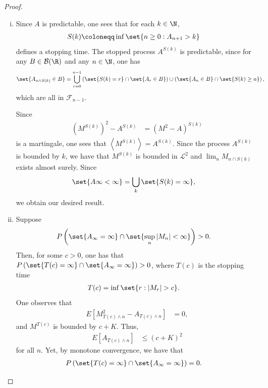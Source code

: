 \documentclass[10pt]{mypackage}
\renewcommand{\coloneq}{\coloneqq}
\begin{document}
\begin{proof}\hfill
  \begin{enumerate}[(i)]
    \item Since $A$ is predictable, one sees that for each $k\in \N$,
      \begin{align*}
        S(k) &\coloneq \inf\set{n\geq 0 : A_{n+1} > k}
      \end{align*}
      defines a stopping time. The stopped process $A^{S(k)}$ is predictable, since for any $B\in \mathcal{B}(\R)$ and any $n\in \N$, one has
      \begin{align*}
        \set{A_{n\wedge S(k)}\in B} &= \bigcup_{r=0}^{n-1}\left( \set{S(k) = r}\cap \set{A_r\in B} \right) \cup \left( \set{A_n\in B}\cap \set{S(k) \geq n} \right),
      \end{align*}
      which are all in $\mathcal{F}_{n-1}$.

      Since
      \begin{align*}
        \left( M^{S(k)} \right)^2 - A^{S(k)} &= \left( M^2-A \right)^{S(k)}
      \end{align*}
      is a martingale, one sees that $ \left\langle M^{S(k)} \right\rangle = A^{S(k)} $. Since the process $A^{S(k)}$ is bounded by $k$, we have that $M^{S(k)}$ is bounded in $ \mathcal{L}^2 $ and $\lim_{n} M_{n\cap S(k)}$ exists almost surely. Since
      \begin{align*}
        \set{A{\infty} < \infty} &= \bigcup_{k}\set{S(k) = \infty},
      \end{align*}
      we obtain our desired result.
    \item Suppose
      \begin{align*}
        P\left( \set{A_{\infty} = \infty}\cap \set{\sup_{n}\left\vert M_n \right\vert < \infty} \right) &> 0.
      \end{align*}
      Then, for some $c > 0$, one has that $P\left( \set{T(c) = \infty}\cap \set{A_{\infty} = \infty} \right) > 0$, where $T(c)$ is the stopping time
      \begin{align*}
        T(c) &= \inf\set{r : \left\vert M_r \right\vert > c}.
      \end{align*}
      One observes that
      \begin{align*}
        E\left[ M_{T(c)\wedge n}^2 - A_{T(c)\wedge n} \right] &= 0,
      \end{align*}
      and $M^{T(c)}$ is bounded by $c + K$. Thus,
      \begin{align*}
        E\left[ A_{T(c)\wedge n} \right] &\leq \left( c+ K \right)^2
      \end{align*}
      for all $n$. Yet, by monotone convergence, we have that 
      \begin{align*}
        P\left( \set{T(c) = \infty}\cap \set{A_{\infty} = \infty} \right) &= 0.
      \end{align*}
  \end{enumerate}
\end{proof}
\end{document}
